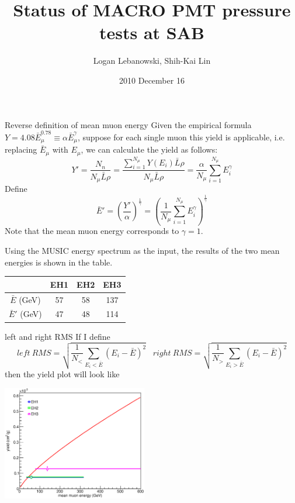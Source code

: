 \documentclass{beamer}
\begin{document}
\title{Status of MACRO PMT pressure tests at SAB}
\author{Logan Lebanowski, Shih-Kai Lin}
\date{2010 December 16}


\begin{frame}{Reverse definition of mean muon energy}
	Given the empirical formula $Y=4.08\bar{E}_{\mu}^{0.78}\equiv \alpha\bar{E}_{\mu}^{\gamma}$, suppose for each single muon this yield is applicable, i.e. replacing $\bar{E}_{\mu}$ with ${E}_{\mu}$, we can calculate the yield as follows:
	\begin{equation*}
	  Y'=\frac{N_n}{N_{\mu}\bar{L}\rho}=\frac{\sum\limits_{i=1}^{N_{\mu}}Y(E_i)\bar{L}\rho }{N_{\mu}\bar{L}\rho}=\frac{\alpha}{N_{\mu}}\sum\limits_{i=1}^{N_{\mu}}E_i^\gamma
	\end{equation*}
	Define
	\begin{equation*}
		\bar{E}'=\left( \frac{Y'}{\alpha} \right) ^{\frac{1}{\gamma}}=\left( \frac{1}{N_{\mu}}\sum\limits_{i=1}^{N_{\mu}}E_i^\gamma \right)^{\frac{1}{\gamma}}
	\end{equation*}
	Note that the mean muon energy corresponds to $\gamma=1$.
\end{frame}


\begin{frame}
	Using the MUSIC energy spectrum as the input, the results of the two mean energies is shown in the table.
	\begin{table}
		\begin{tabular}{|c|c|c|c|}
			\hline
			 & EH1 & EH2 & EH3 \\
			\hline
			$\bar{E}$ (GeV) & 57 & 58 & 137 \\
			$\bar{E}'$ (GeV) & 47 & 48 & 114 \\
			\hline
		\end{tabular}	
	\end{table}
\end{frame}


\begin{frame}{left and right RMS}
	\scriptsize
	If I define
	\begin{equation*}
		left\: RMS=\sqrt{\frac{1}{N_<}\sum\limits_{E_i<\bar{E}}(E_i-\bar{E})^2}
		\;\;\;
		right\: RMS=\sqrt{\frac{1}{N_>}\sum\limits_{E_i>\bar{E}}(E_i-\bar{E})^2}
	\end{equation*}
	then the yield plot will look like
	\begin{center}
		\includegraphics[height=5cm]{LeftRightRMS.eps}
	\end{center}
\end{frame}
\end{document}
